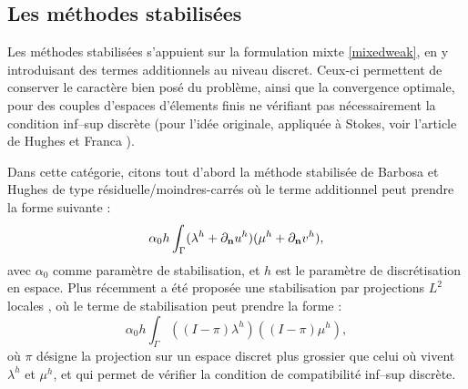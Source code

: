 \documentclass[11pt]{book}
\def\n{{\bf n}}
\newcommand{\dnu}{\partial_{\n} u}
\newcommand{\dnv}{\partial_{\n} v}
\begin{document}
\subsection{Les méthodes stabilisées}

Les méthodes stabilisées s'appuient sur la formulation mixte \eqref{mixedweak}, en y introduisant des termes additionnels au niveau discret. Ceux-ci permettent de conserver le caractère bien posé du problème, ainsi que la convergence optimale, pour des couples d'espaces d'élements finis ne vérifiant pas nécessairement la condition inf--sup discrète (pour l'idée originale, appliquée à Stokes, voir l'article de Hughes et Franca \cite{hughes-franca-87}). %

Dans cette catégorie, citons tout d'abord la méthode stabilisée de Barbosa et Hughes de type résiduelle/moindres-carrés %
où le terme additionnel peut prendre la forme suivante \cite{stenberg-95} :
\[
\alpha_0 h \int_\Gamma (\lambda^h + \dnu^h ) (\mu^h + \dnv^h), %
\]
avec $\alpha_0$ comme paramètre de stabilisation, et $h$ est le paramètre de discrétisation en espace.
Plus récemment a été proposée une stabilisation par projections $L^2$ locales \cite{burman-2014}, 
où le terme de stabilisation peut prendre la forme :
\[
\alpha_0 h \int_\Gamma ( (I-\pi) \lambda^h ) ( (I-\pi) \mu^h ), %
\]
où $\pi$ désigne la projection sur un espace discret plus grossier que celui où vivent $\lambda^h$ et $\mu^h$, et qui permet de vérifier la condition de compatibilité inf--sup discrète. %
\end{document}
